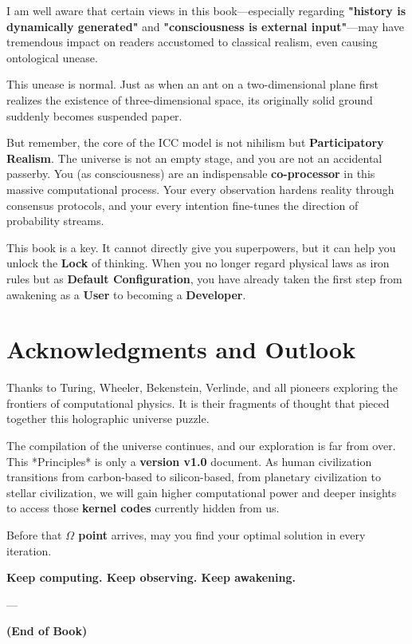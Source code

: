 I am well aware that certain views in this book—especially regarding \textbf{"history is dynamically generated"} and \textbf{"consciousness is external input"}—may have tremendous impact on readers accustomed to classical realism, even causing ontological unease.

This unease is normal. Just as when an ant on a two-dimensional plane first realizes the existence of three-dimensional space, its originally solid ground suddenly becomes suspended paper.

But remember, the core of the ICC model is not nihilism but \textbf{Participatory Realism}. The universe is not an empty stage, and you are not an accidental passerby. You (as consciousness) are an indispensable \textbf{co-processor} in this massive computational process. Your every observation hardens reality through consensus protocols, and your every intention fine-tunes the direction of probability streams.

This book is a key. It cannot directly give you superpowers, but it can help you unlock the \textbf{Lock} of thinking. When you no longer regard physical laws as iron rules but as \textbf{Default Configuration}, you have already taken the first step from awakening as a \textbf{User} to becoming a \textbf{Developer}.

\section{Acknowledgments and Outlook}

Thanks to Turing, Wheeler, Bekenstein, Verlinde, and all pioneers exploring the frontiers of computational physics. It is their fragments of thought that pieced together this holographic universe puzzle.

The compilation of the universe continues, and our exploration is far from over. This *Principles* is only a \textbf{version v1.0} document. As human civilization transitions from carbon-based to silicon-based, from planetary civilization to stellar civilization, we will gain higher computational power and deeper insights to access those \textbf{kernel codes} currently hidden from us.

Before that \textbf{$\Omega$ point} arrives, may you find your optimal solution in every iteration.

\textbf{Keep computing. Keep observing. Keep awakening.}

---

\textbf{(End of Book)}
